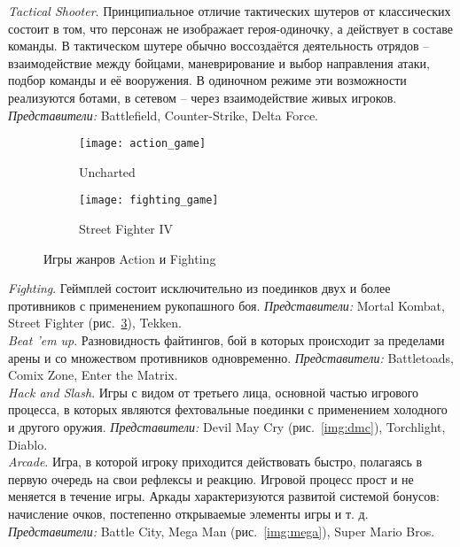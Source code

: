\emph{Tactical Shooter}. Принципиальное отличие тактических шутеров от классических состоит в том, 
что персонаж не изображает героя-одиночку, а действует в составе команды. В тактическом шутере обычно 
воссоздаётся деятельность отрядов -- взаимодействие между бойцами, маневрирование и выбор направления 
атаки, подбор команды и её вооружения. В одиночном режиме эти возможности реализуются ботами, в 
сетевом -- через взаимодействие живых игроков. \emph{Представители:} Battlefield, Counter-Strike, 
Delta Force.

\begin{figure}[!ht]
    \centering
    \begin{subfigure}[b]{0.45\textwidth}
        \texttt{[image: action\_game]}
        \caption{Uncharted}
        \label{img:uncharted}
    \end{subfigure}
    \begin{subfigure}[b]{0.45\textwidth}
        \texttt{[image: fighting\_game]}
        \caption{Street Fighter IV}
        \label{img:street}
    \end{subfigure}
    \caption{Игры жанров Action и Fighting}
\end{figure}

\emph{Fighting}. Геймплей состоит исключительно из поединков двух и более противников с применением 
рукопашного боя. \emph{Представители:} Mortal Kombat, Street Fighter (рис.~\ref{img:street}), 
Tekken.\\

\emph{Beat ’em up}. Разновидность файтингов, бой в которых происходит за пределами арены и со 
множеством противников одновременно. \emph{Представители:} Battletoads, Comix Zone, 
Enter the Matrix.\\

\emph{Hack and Slash}. Игры с видом от третьего лица, основной частью игрового процесса, в которых 
являются фехтовальные поединки с применением холодного и другого оружия. \emph{Представители:} 
Devil May Cry (рис.~\ref{img:dmc}), Torchlight, Diablo.\\

\emph{Arcade}. Игра, в которой игроку приходится действовать быстро, полагаясь в первую очередь на свои 
рефлексы и реакцию. Игровой процесс прост и не меняется в течение игры. Аркады характеризуются 
развитой системой бонусов: начисление очков, постепенно открываемые элементы игры и т. д. 
\emph{Представители:} Battle City, Mega Man (рис.~\ref{img:mega}), Super Mario Bros.\\

